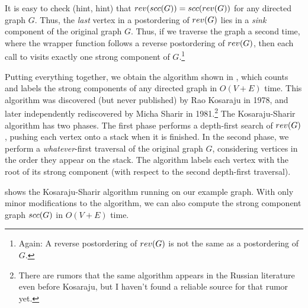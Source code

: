 \medskip
It is easy to check (hint, hint) that $rev(scc(G)) = scc(rev(G))$ for any directed graph $G$.
Thus, the \textit{last} vertex in a postordering of $rev(G)$ lies in a \textit{sink} component of the original graph $G$.
Thus, if we traverse the graph a second time, where the wrapper function follows a reverse postordering of $rev(G)$, then each call to  visits exactly one strong component of $G$.\footnote{Again: A reverse postordering of $rev(G)$ is not the same as a postordering of $G$.}

Putting everything together, we obtain the algorithm shown in , which counts and labels the strong components of any directed graph in $O(V+E)$ time.
This algorithm was discovered (but never published) by Rao Kosaraju in 1978, and later independently rediscovered by Micha Sharir in 1981.\footnote{There are rumors that the same algorithm appears in the Russian literature even before Kosaraju, but I haven’t found a reliable source for that rumor yet.}
The Kosaraju-Sharir algorithm has two phases.
The first phase performs a depth-first search of $rev(G)$, pushing each vertex onto a stack when it is finished.
In the second phase, we perform a \textit{whatever}-first traversal of the original graph $G$, considering vertices in the order they appear on the stack.
The algorithm labels each vertex with the root of its strong component (with respect to the second depth-first traversal).

 shows the Kosaraju-Sharir algorithm running on our example graph.
With only minor modifications to the algorithm, we can also compute the strong component graph $scc(G)$ in $O(V+E)$ time.


